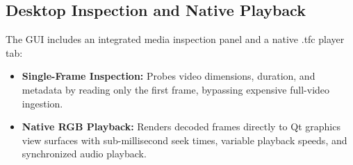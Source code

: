 \subsection{Desktop Inspection and Native Playback}
The GUI includes an integrated media inspection panel and a native .tfc player tab:
\begin{itemize}
    \item \textbf{Single-Frame Inspection:} Probes video dimensions, duration, and metadata by reading only the first frame, bypassing expensive full-video ingestion.
    \item \textbf{Native RGB Playback:} Renders decoded frames directly to Qt graphics view surfaces with sub-millisecond seek times, variable playback speeds, and synchronized audio playback.
\end{itemize}
